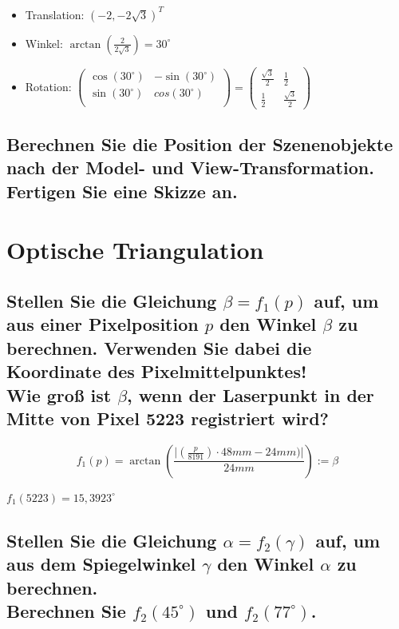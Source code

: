 \documentclass[a4paper,10pt,DIV=14]{scrartcl}
\newcommand{\dg}[1]{#1^\circ}
\begin{document}
\begin{itemize}
	\item Translation: $ (-2, -2\sqrt{3})^T $
	\item Winkel: $ \arctan(\frac{2}{2\sqrt{3}}) = \dg{30} $
	\item Rotation: $ \begin{pmatrix}	\cos(\dg{30}) & -\sin(\dg{30}) \\ \sin(\dg{30}) & cos(\dg{30}) \\ \end{pmatrix}
	= \begin{pmatrix} \frac{\sqrt{3}}{2} & \frac{1}{2} \\ \frac{1}{2} & \frac{\sqrt{3}}{2} \end{pmatrix} $
\end{itemize}


\subsection{Berechnen Sie die Position der Szenenobjekte nach der Model- und View-Transformation. Fertigen Sie eine Skizze an.}



\section{Optische Triangulation}

\subsection{Stellen Sie die Gleichung $\beta = f_1(p)$ auf, um aus einer Pixelposition $p$ den Winkel $\beta$ zu berechnen. Verwenden Sie dabei die Koordinate des Pixelmittelpunktes! \\ Wie groß ist $\beta$, wenn der Laserpunkt in der Mitte von Pixel 5223 registriert wird?}


$$f_1(p) = \arctan \left( \frac{\vert (\frac{p}{8191}) \cdot 48mm - 24mm) \vert}{24 mm} \right) := \beta $$

$f_1(5223) = \dg{15,3923}$

\subsection{Stellen Sie die Gleichung $\alpha = f_2(\gamma)$ auf, um aus dem Spiegelwinkel $\gamma$ den Winkel $\alpha$ zu berechnen. \\ Berechnen Sie $f_2(45^\circ)$ und $f_2(77^\circ)$.}
\end{document}
